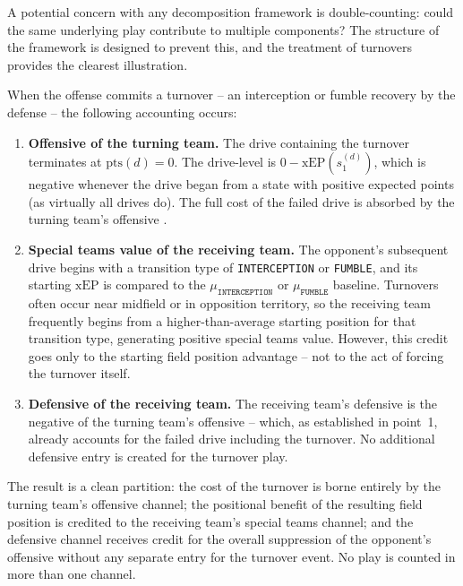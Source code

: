 A potential concern with any decomposition framework is double-counting:
could the same underlying play contribute to multiple components? The
structure of the \gds{} framework is designed to prevent this, and the
treatment of turnovers provides the clearest illustration.

When the offense commits a turnover -- an interception or fumble recovery by
the defense -- the following accounting occurs:

\begin{enumerate}
  \item \textbf{Offensive \xvoa{} of the turning team.} The drive containing
        the turnover terminates at $\mathrm{pts}(d) = 0$. The drive-level
        \xvoa{} is $0 - \mathrm{xEP}(s_1^{(d)})$, which is negative whenever
        the drive began from a state with positive expected points (as
        virtually all drives do). The full cost of the failed drive is
        absorbed by the turning team's offensive \xvoa{}.

  \item \textbf{Special teams value of the receiving team.} The opponent's
        subsequent drive begins with a transition type of
        \texttt{INTERCEPTION} or \texttt{FUMBLE}, and its starting
        $\mathrm{xEP}$ is compared to the $\mu_{\texttt{INTERCEPTION}}$ or
        $\mu_{\texttt{FUMBLE}}$ baseline. Turnovers often occur near midfield
        or in opposition territory, so the receiving team frequently begins
        from a higher-than-average starting position for that transition type,
        generating positive special teams value. However, this credit goes only
        to the starting field position advantage -- not to the act of forcing
        the turnover itself.

  \item \textbf{Defensive \xvoa{} of the receiving team.} The receiving team's
        defensive \xvoa{} is the negative of the turning team's offensive
        \xvoa{} -- which, as established in point~1, already accounts for the
        failed drive including the turnover. No additional defensive entry is
        created for the turnover play.
\end{enumerate}

The result is a clean partition: the cost of the turnover is borne entirely
by the turning team's offensive channel; the positional benefit of the
resulting field position is credited to the receiving team's special teams
channel; and the defensive channel receives credit for the overall
suppression of the opponent's offensive \xvoa{} without any separate
entry for the turnover event. No play is counted in more than one channel.

